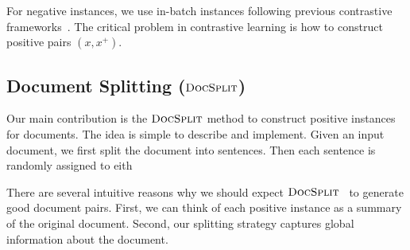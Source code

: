 \documentclass[11pt]{article}
\newcommand{\our}{\mbox{\textsc{DocSplit}}}
\begin{document}

For negative instances, we use in-batch instances following previous contrastive frameworks~\cite{Gao2021SimCSESC, Li2022UCTopicUC}.
The critical problem in contrastive learning is how to construct positive pairs $(x, x^{+})$.

\subsection{Document Splitting ($\our$)}
Our main contribution is the $\our$ method to construct positive instances for documents. 
The idea is simple to describe and implement.
Given an input document, we first split the document into sentences.
Then each sentence is randomly assigned to eith

There are several intuitive reasons why we should expect $\our$
~to generate good document pairs.
First, we can think of each positive instance as a summary of the original document.
Second, our splitting strategy captures global information about the document.
\end{document}
